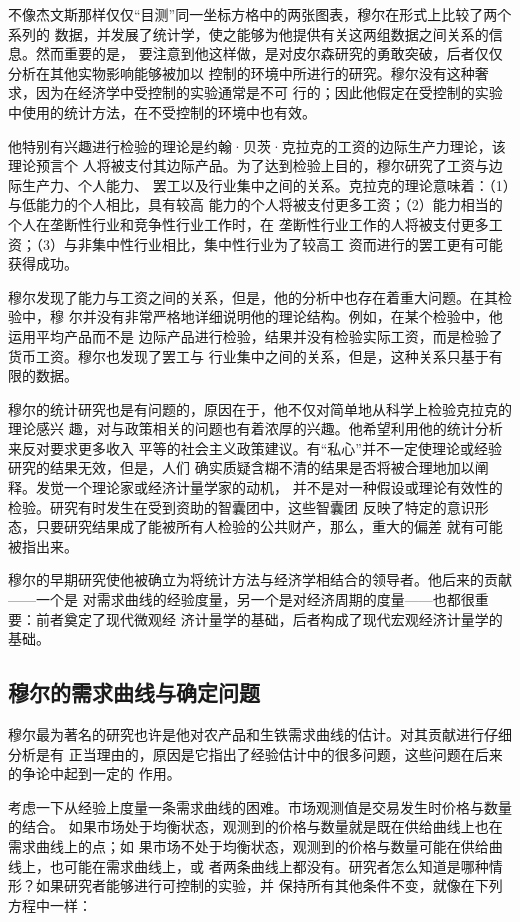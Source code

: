 不像杰文斯那样仅仅“目测”同一坐标方格中的两张图表，穆尔在形式上比较了两个系列的
数据，并发展了统计学，使之能够为他提供有关这两组数据之间关系的信息。然而重要的是，
要注意到他这样做，是对皮尔森研究的勇敢突破，后者仅仅分析在其他实物影响能够被加以
控制的环境中所进行的研究。穆尔没有这种奢求，因为在经济学中受控制的实验通常是不可
行的；因此他假定在受控制的实验中使用的统计方法，在不受控制的环境中也有效。

他特别有兴趣进行检验的理论是约翰·贝茨·克拉克的工资的边际生产力理论，该理论预言个
人将被支付其边际产品。为了达到检验上目的，穆尔研究了工资与边际生产力、个人能力、
罢工以及行业集中之间的关系。克拉克的理论意味着：（1）与低能力的个人相比，具有较高
能力的个人将被支付更多工资；（2）能力相当的个人在垄断性行业和竞争性行业工作时，在
垄断性行业工作的人将被支付更多工资；（3）与非集中性行业相比，集中性行业为了较高工
资而进行的罢工更有可能获得成功。

穆尔发现了能力与工资之间的关系，但是，他的分析中也存在着重大问题。在其检验中，穆
尔并没有非常严格地详细说明他的理论结构。例如，在某个检验中，他运用平均产品而不是
边际产品进行检验，结果并没有检验实际工资，而是检验了货币工资。穆尔也发现了罢工与
行业集中之间的关系，但是，这种关系只基于有限的数据。

穆尔的统计研究也是有问题的，原因在于，他不仅对简单地从科学上检验克拉克的理论感兴
趣，对与政策相关的问题也有着浓厚的兴趣。他希望利用他的统计分析来反对要求更多收入
平等的社会主义政策建议。有“私心”并不一定使理论或经验研究的结果无效，但是，人们
确实质疑含糊不清的结果是否将被合理地加以阐释。发觉一个理论家或经济计量学家的动机，
并不是对一种假设或理论有效性的检验。研究有时发生在受到资助的智囊团中，这些智囊团
反映了特定的意识形态，只要研究结果成了能被所有人检验的公共财产，那么，重大的偏差
就有可能被指出来。

穆尔的早期研究使他被确立为将统计方法与经济学相结合的领导者。他后来的贡献——一个是
对需求曲线的经验度量，另一个是对经济周期的度量——也都很重要：前者奠定了现代微观经
济计量学的基础，后者构成了现代宏观经济计量学的基础。

\subsection{穆尔的需求曲线与确定问题}

穆尔最为著名的研究也许是他对农产品和生铁需求曲线的估计。对其贡献进行仔细分析是有
正当理由的，原因是它指出了经验估计中的很多问题，这些问题在后来的争论中起到一定的
作用。

考虑一下从经验上度量一条需求曲线的困难。市场观测值是交易发生时价格与数量的结合。
如果市场处于均衡状态，观测到的价格与数量就是既在供给曲线上也在需求曲线上的点；如
果市场不处于均衡状态，观测到的价格与数量可能在供给曲线上，也可能在需求曲线上，或
者两条曲线上都没有。研究者怎么知道是哪种情形？如果研究者能够进行可控制的实验，并
保持所有其他条件不变，就像在下列方程中一样：

